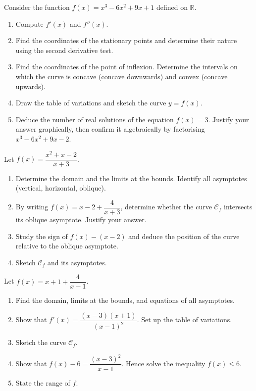 \documentclass[11pt]{article}
\begin{document}
\begin{exercice}
Consider the function $f(x) = x^3 - 6x^2 + 9x + 1$ defined on $\mathbb{R}$.
\begin{enumerate}
    \item Compute $f'(x)$ and $f''(x)$.
    \item Find the coordinates of the stationary points and determine their nature using the second derivative test.
    \item Find the coordinates of the point of inflexion. Determine the intervals on which the curve is concave (concave downwards) and convex (concave upwards).
    \item Draw the table of variations and sketch the curve $y = f(x)$.
    \item Deduce the number of real solutions of the equation $f(x) = 3$. Justify your answer graphically, then confirm it algebraically by factorising $x^3 - 6x^2 + 9x - 2$.
\end{enumerate}
\end{exercice}

\begin{exercice}
Let $f(x) = \dfrac{x^2 + x - 2}{x + 3}$.
\begin{enumerate}
    \item Determine the domain and the limits at the bounds. Identify all asymptotes (vertical, horizontal, oblique).
    \item By writing $f(x) = x - 2 + \dfrac{4}{x+3}$, determine whether the curve $\mathcal{C}_f$ intersects its oblique asymptote. Justify your answer.
    \item Study the sign of $f(x) - (x - 2)$ and deduce the position of the curve relative to the oblique asymptote.
    \item Sketch $\mathcal{C}_f$ and its asymptotes.
\end{enumerate}
\end{exercice}

\begin{exercice}
Let $f(x) = x + 1 + \dfrac{4}{x - 1}$.
\begin{enumerate}
    \item Find the domain, limits at the bounds, and equations of all asymptotes.
    \item Show that $f'(x) = \dfrac{(x-3)(x+1)}{(x-1)^2}$. Set up the table of variations.
    \item Sketch the curve $\mathcal{C}_f$.
    \item Show that $f(x) - 6 = \dfrac{(x-3)^2}{x-1}$. Hence solve the inequality $f(x) \le 6$.
    \item State the range of $f$.
\end{enumerate}
\end{exercice}
\end{document}
